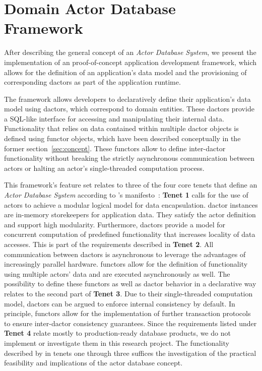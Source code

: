 
\section{Domain Actor Database Framework}\label{sec:framework}

After describing the general concept of an \textit{Actor Database System}, we present the implementation of an proof-of-concept application development framework, which allows for the definition of an application's data model and the provisioning of corresponding \glspl{dactor} as part of the application runtime.

The framework allows developers to declaratively define their application's data model using \glspl{dactor}, which correspond to domain entities.
These \glspl{dactor} provide a SQL-like interface for accessing and manipulating their internal data.
Functionality that relies on data contained within multiple \gls{dactor} objects is defined using \gls{functor} objects, which have been described conceptually in the former section~\ref{sec:concept}.
These \glspl{functor} allow to define inter-\gls{dactor} functionality without breaking the strictly asynchronous communication between actors or halting an actor's single-threaded computation process.

This framework's feature set relates to three of the four core tenets that define an \textit{Actor Database System} according to \citeauthor{manifesto}'s manifesto~\cite{manifesto}:
\textbf{Tenet 1} calls for the use of actors to achieve a modular logical model for data encapsulation.
\Gls{dactor} instances are in-memory storekeepers for application data.
They satisfy the actor definition and support high modularity.
Furthermore, \glspl{dactor} provide a model for concurrent computation of predefined functionality that increases locality of data accesses.
This is part of the requirements described in \textbf{Tenet 2}.
All communication between \glspl{dactor} is asynchronous to leverage the advantages of increasingly parallel hardware.
\Glspl{functor} allow for the definition of functionality using multiple actors' data and are executed asynchronously as well.
The possibility to define these \glspl{functor} as well as \gls{dactor} behavior in a declarative way relates to the second part of \textbf{Tenet 3}.
Due to their single-threaded computation model, \glspl{dactor} can be argued to enforce internal consistency by default.
In principle, \glspl{functor} allow for the implementation of further transaction protocols to ensure inter-\gls{dactor} consistency guarantees.
Since the requirements listed under \textbf{Tenet 4} relate mostly to production-ready database products, we do not implement or investigate them in this research project.
The functionality described by \citeauthor{manifesto} in tenets one through three suffices the investigation of the practical feasibility and implications of the actor database concept.

